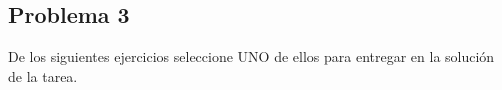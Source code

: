 \subsection*{Problema 3}
De los siguientes ejercicios seleccione UNO de ellos para entregar en la solución de la tarea.